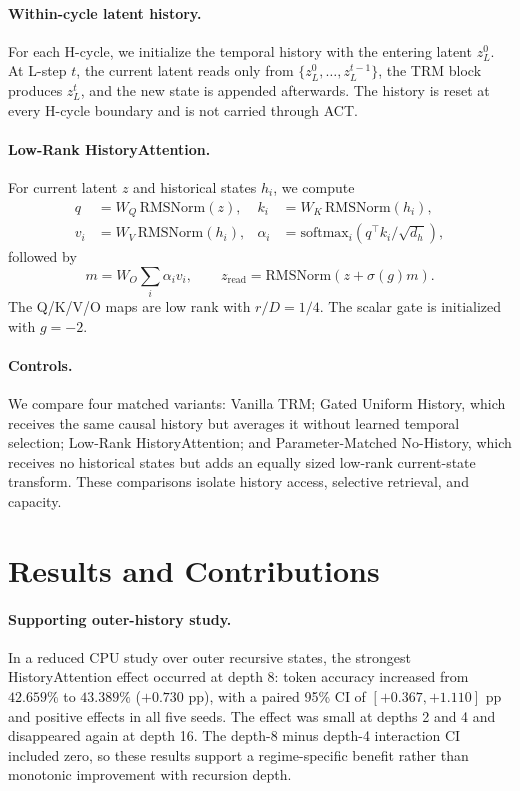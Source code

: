 \paragraph{Within-cycle latent history.}
For each H-cycle, we initialize the temporal history with the entering latent
$z_L^0$. At L-step $t$, the current latent reads only from
$\{z_L^0,\ldots,z_L^{t-1}\}$, the TRM block produces $z_L^t$, and the new state
is appended afterwards. The history is reset at every H-cycle boundary and is
not carried through ACT.

\paragraph{Low-Rank HistoryAttention.}
For current latent $z$ and historical states $h_i$, we compute
\begin{align}
q &= W_Q\,\mathrm{RMSNorm}(z), &
k_i &= W_K\,\mathrm{RMSNorm}(h_i),\\
v_i &= W_V\,\mathrm{RMSNorm}(h_i), &
\alpha_i &= \mathrm{softmax}_i(q^\top k_i/\sqrt{d_h}),
\end{align}
followed by
\begin{equation}
m=W_O\sum_i\alpha_i v_i,\qquad
z_{\mathrm{read}}=\mathrm{RMSNorm}\!\left(z+\sigma(g)m\right).
\end{equation}
The Q/K/V/O maps are low rank with $r/D=1/4$. The scalar gate is initialized
with $g=-2$.

\paragraph{Controls.}
We compare four matched variants: Vanilla TRM; Gated Uniform History, which
receives the same causal history but averages it without learned temporal
selection; Low-Rank HistoryAttention; and Parameter-Matched No-History, which
receives no historical states but adds an equally sized low-rank current-state
transform. These comparisons isolate history access, selective retrieval, and
capacity.

\section{Results and Contributions}
\paragraph{Supporting outer-history study.}
In a reduced CPU study over outer recursive states, the strongest
HistoryAttention effect occurred at depth 8: token accuracy increased from
$42.659\%$ to $43.389\%$ ($+0.730$ pp), with a paired 95\% CI of
$[+0.367,+1.110]$ pp and positive effects in all five seeds. The effect was
small at depths 2 and 4 and disappeared again at depth 16. The depth-8 minus
depth-4 interaction CI included zero, so these results support a
regime-specific benefit rather than monotonic improvement with recursion
depth.

